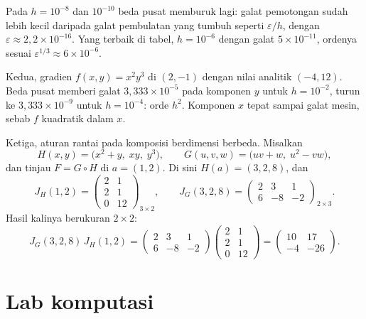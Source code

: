 Pada $h=10^{-8}$ dan $10^{-10}$ beda pusat memburuk lagi: galat pemotongan sudah lebih kecil
daripada galat pembulatan yang tumbuh seperti $\varepsilon/h$, dengan
$\varepsilon\approx2{,}2\times10^{-16}$. Yang terbaik di tabel, $h=10^{-6}$ dengan galat
$5\times10^{-11}$, ordenya sesuai $\varepsilon^{1/3}\approx6\times10^{-6}$.

Kedua, gradien $f(x,y)=x^{2}y^{3}$ di $(2,-1)$ dengan nilai analitik $(-4,12)$. Beda pusat
memberi galat $3{,}333\times10^{-5}$ pada komponen $y$ untuk $h=10^{-2}$, turun ke
$3{,}333\times10^{-9}$ untuk $h=10^{-4}$: orde $h^{2}$. Komponen $x$ tepat sampai galat mesin,
sebab $f$ kuadratik dalam $x$.

Ketiga, aturan rantai pada komposisi berdimensi berbeda. Misalkan
\[
  H(x,y)=\bigl(x^{2}+y,\;xy,\;y^{3}\bigr),\qquad
  G(u,v,w)=\bigl(uv+w,\;u^{2}-vw\bigr),
\]
dan tinjau $F=G\circ H$ di $a=(1,2)$. Di sini $H(a)=(3,2,8)$, dan
\[
  J_{H}(1,2)=\begin{pmatrix}2&1\\ 2&1\\ 0&12\end{pmatrix}_{3\times2},
  \qquad
  J_{G}(3,2,8)=\begin{pmatrix}2&3&1\\ 6&-8&-2\end{pmatrix}_{2\times3}.
\]
Hasil kalinya berukuran $2\times2$:
\[
  J_{G}(3,2,8)\,J_{H}(1,2)=
  \begin{pmatrix}2&3&1\\ 6&-8&-2\end{pmatrix}
  \begin{pmatrix}2&1\\ 2&1\\ 0&12\end{pmatrix}
  =\begin{pmatrix}10&17\\ -4&-26\end{pmatrix}.
\]

\section{Lab komputasi}

